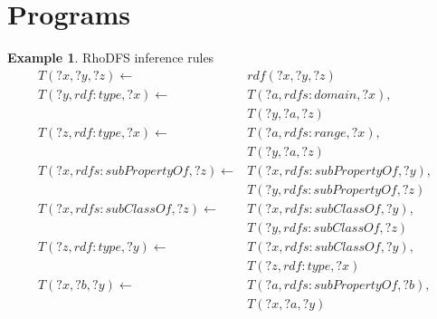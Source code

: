\documentclass[sigconf,screen,review,natbib]{acmart}
\theoremstyle{definition}
\newtheorem{exmp}{Example}[section]
\begin{document}
\section{Programs}
\begin{exmp}{RhoDFS inference rules}
	\begin{align*}
		T(?x, ?y, ?z) \leftarrow                 & rdf(?x, ?y, ?z)                \\
		T(?y, rdf:type, ?x) \leftarrow           & T(?a, rdfs:domain, ?x),        \\
		                                         & T(?y, ?a, ?z)                  \\
		T(?z, rdf:type, ?x) \leftarrow           & T(?a, rdfs:range, ?x),         \\
		                                         & T(?y, ?a, ?z)                  \\
		T(?x, rdfs:subPropertyOf, ?z) \leftarrow & T(?x, rdfs:subPropertyOf, ?y), \\
		                                         & T(?y, rdfs:subPropertyOf, ?z)  \\
		T(?x, rdfs:subClassOf, ?z) \leftarrow    & T(?x, rdfs:subClassOf, ?y),    \\
		                                         & T(?y, rdfs:subClassOf, ?z)     \\
		T(?z, rdf:type, ?y) \leftarrow           & T(?x, rdfs:subClassOf, ?y),    \\
		                                         & T(?z, rdf:type, ?x)            \\
		T(?x, ?b, ?y) \leftarrow                 & T(?a, rdfs:subPropertyOf, ?b), \\
		                                         & T(?x, ?a, ?y)
	\end{align*}
	\label{program:rhodfs}
\end{exmp}
\end{document}
